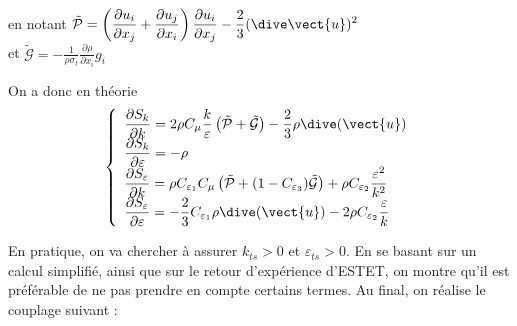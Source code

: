 en notant
$\displaystyle\tilde{\mathcal{P}}
= \left(\frac{\partial u_i}{\partial x_j} +
\frac{\partial u_j}{\partial x_i}\right)\frac{\partial u_i}{\partial x_j}
-\frac{2}{3}(\dive\vect{u})^2$\\
et
$\displaystyle\tilde{\mathcal{G}}
= -\frac{1}{\rho\sigma_t}
\frac{\partial\rho}{\partial x_i}g_i$

On a donc en th\'eorie
\begin{equation}
\left\{\begin{array}{l}
\displaystyle \frac{\partial S_k}{\partial k}=
2\rho C_\mu\frac{k}{\varepsilon}\left(\tilde{\mathcal{P}}+\tilde{\mathcal{G}}\right)
-\frac{2}{3}\rho \dive(\vect{u})\\
\displaystyle \frac{\partial S_k}{\partial \varepsilon}= -\rho\\
\displaystyle \frac{\partial S_\varepsilon}{\partial k}=
\rho C_{\varepsilon_1} C_\mu \left(\tilde{\mathcal{P}}
+(1-C_{\varepsilon_3})\tilde{\mathcal{G}}\right)
+\rho C_{\varepsilon_2}\frac{\varepsilon^2}{k^2}\\
\displaystyle \frac{\partial S_\varepsilon}{\partial \varepsilon}=
-\frac{2}{3}C_{\varepsilon_1}\rho \dive(\vect{u})
-2\rho C_{\varepsilon_2}\frac{\varepsilon}{k}
\end{array}\right.
\end{equation}

En pratique, on va chercher \`a assurer $k_{ts}>0$ et $\varepsilon_{ts}>0$. En se
basant sur un calcul simplifi\'e, ainsi que sur le retour d'exp\'erience
d'ESTET, on montre qu'il est pr\'ef\'erable de ne pas prendre en compte
certains termes. Au final, on r\'ealise le couplage suivant :


